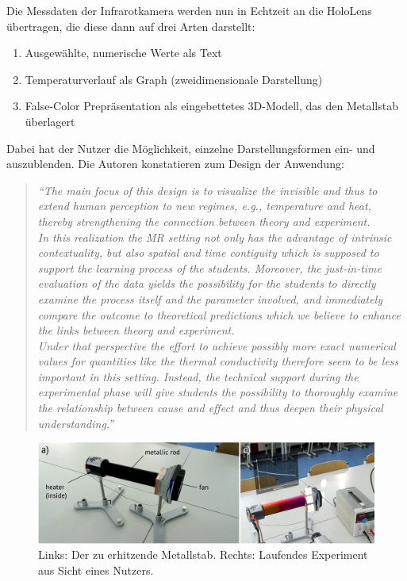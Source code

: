 Die Messdaten der Infrarotkamera werden nun in Echtzeit an die HoloLens übertragen, die diese dann auf drei Arten darstellt:
\begin{enumerate}
	\item Ausgewählte, numerische Werte als Text
	\item Temperaturverlauf als Graph (zweidimensionale Darstellung)
	\item False-Color Prepräsentation als eingebettetes 3D-Modell, das den Metallstab überlagert
\end{enumerate}
Dabei hat der Nutzer die Möglichkeit, einzelne Darstellungsformen ein- und auszublenden. Die Autoren konstatieren zum Design der Anwendung:
\begin{quote}
	\textit{``The main focus of this design is to visualize the invisible and thus to extend human perception to new regimes, e.g., temperature and heat, thereby strengthening the connection between theory and experiment.\\ 
	In this realization the MR setting not only has the advantage of intrinsic contextuality, but also spatial and time contiguity which is supposed to support the learning process of the students. Moreover, the just-in-time evaluation of the data yields the possibility for the students to directly examine the process itself and the parameter involved, and immediately compare the outcome to theoretical predictions which we believe to enhance the links between theory and experiment.\\
	Under that perspective the effort to achieve possibly more exact numerical values for quantities like the thermal conductivity therefore seem to be less important in this setting. Instead, the technical support during the experimental phase will give students the possibility to thoroughly examine the relationship between cause and effect and thus deepen their physical understanding.''} \cite{Strzys17}
\end{quote}


\begin{figure}[h!]
	\centering
	\includegraphics[width=1\textwidth]{images/Strzys18.png}
	\caption{Links: Der zu erhitzende Metallstab. Rechts: Laufendes Experiment aus Sicht eines Nutzers. \cite{Strzys17}}
	\label{img:Strzys17}
\end{figure}

